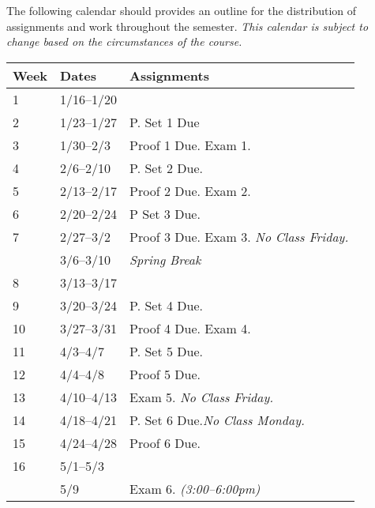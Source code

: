 \documentclass[10pt]{article}
\begin{document}
The following calendar should provides an outline for the distribution of assignments and work throughout the semester.  \textit{This calendar is subject to change based on the circumstances of the course.}
\begin{center}
\begin{tabular}{lll}
Week & Dates & Assignments \\ \toprule
1 & 1/16--1/20 &    \\
2 & 1/23--1/27 &  P. Set 1 Due \\
3 & 1/30--2/3 &   Proof 1 Due. Exam 1. \\
4 & 2/6--2/10 &   P. Set 2 Due. \\
5 & 2/13--2/17 & Proof 2 Due. Exam 2. \\
6 & 2/20--2/24 & P Set 3 Due.  \\
7 & 2/27--3/2 & Proof 3 Due. Exam 3. \textit{No Class Friday.} \\
 & 3/6--3/10 & \textit{Spring Break} \\
8 & 3/13--3/17 &  \\
9 & 3/20--3/24 &  P. Set 4 Due. \\
10 & 3/27--3/31 &  Proof 4 Due. Exam 4.  \\
11 & 4/3--4/7 &  P. Set 5 Due.  \\
12 & 4/4--4/8 &  Proof 5 Due. \\
13 & 4/10--4/13 & Exam 5.  \textit{No Class Friday.}   \\
14 & 4/18--4/21 & P. Set 6 Due.\textit{No Class Monday.}  \\
15 & 4/24--4/28 & Proof 6 Due. \\
16 & 5/1--5/3 &   \\ \midrule
   & 5/9 & Exam 6.  \textit{(3:00--6:00pm)}  \\
\end{tabular}
\end{center}
\end{document}

